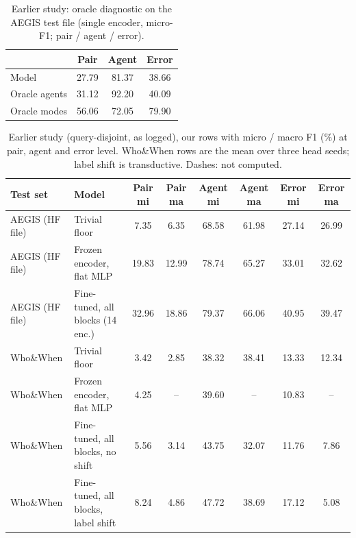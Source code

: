 \begin{table}[t]
\caption{Earlier study: oracle diagnostic on the AEGIS test file (single encoder, micro-F1; pair / agent / error).}
\label{tab:oracle}
\centering\footnotesize\setlength{\tabcolsep}{3pt}
\begin{tabular}{@{}lccc@{}}
\toprule
 & Pair & Agent & Error \\
\midrule
Model & 27.79 & 81.37 & 38.66 \\
Oracle agents & 31.12 & 92.20 & 40.09 \\
Oracle modes & 56.06 & 72.05 & 79.90 \\
\bottomrule
\end{tabular}
\end{table}

\begin{table}[t]
\caption{Earlier study (query-disjoint, as logged), our rows with micro / macro F1 (\%) at pair, agent and error level. Who\&When rows are the mean over three head seeds; label shift is transductive. Dashes: not computed.}
\label{tab:legacymacro}
\centering\footnotesize\setlength{\tabcolsep}{3pt}
\begin{tabular}{@{}llcccccc@{}}
\toprule
Test set & Model & Pair mi & Pair ma & Agent mi & Agent ma & Error mi & Error ma \\
\midrule
AEGIS (HF file) & Trivial floor & 7.35 & 6.35 & 68.58 & 61.98 & 27.14 & 26.99 \\
AEGIS (HF file) & Frozen encoder, flat MLP & 19.83 & 12.99 & 78.74 & 65.27 & 33.01 & 32.62 \\
AEGIS (HF file) & Fine-tuned, all blocks (14 enc.) & 32.96 & 18.86 & 79.37 & 66.06 & 40.95 & 39.47 \\
Who\&When & Trivial floor & 3.42 & 2.85 & 38.32 & 38.41 & 13.33 & 12.34 \\
Who\&When & Frozen encoder, flat MLP & 4.25 & -- & 39.60 & -- & 10.83 & -- \\
Who\&When & Fine-tuned, all blocks, no shift & 5.56 & 3.14 & 43.75 & 32.07 & 11.76 & 7.86 \\
Who\&When & Fine-tuned, all blocks, label shift & 8.24 & 4.86 & 47.72 & 38.69 & 17.12 & 5.08 \\
\bottomrule
\end{tabular}
\end{table}

